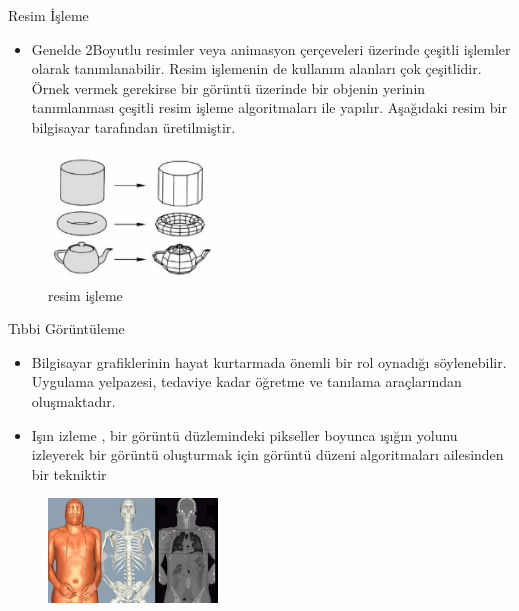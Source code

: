 \documentclass{beamer}
\begin{document}
\begin{frame}{Resim İşleme}
\begin{itemize}
    \item Genelde 2Boyutlu resimler veya animasyon çerçeveleri üzerinde çeşitli işlemler olarak tanımlanabilir. Resim işlemenin de kullanım alanları çok çeşitlidir. Örnek vermek gerekirse bir görüntü üzerinde bir objenin yerinin tanımlanması çeşitli resim işleme algoritmaları ile yapılır. Aşağıdaki resim bir bilgisayar tarafından üretilmiştir.\cite{ebergi}
    
\end{itemize}
\begin{figure}
\includegraphics[width=0.4\textwidth]{resimisleme.jpg}
\caption{resim işleme}
\end{figure}
    
\end{frame}

\begin{frame}{Tıbbi Görüntüleme}
\begin{itemize}

    
    \item Bilgisayar grafiklerinin hayat kurtarmada önemli bir rol oynadığı söylenebilir.
Uygulama yelpazesi, tedaviye kadar öğretme ve tanılama araçlarından
oluşmaktadır.
    \item Işın izleme , bir görüntü düzlemindeki pikseller boyunca ışığın yolunu izleyerek bir görüntü oluşturmak için görüntü düzeni algoritmaları ailesinden bir tekniktir 
    \cite{omercetin}
\end{itemize}

\begin{figure}
\includegraphics[width=0.4\textwidth]{img39.jpg}
\caption{}
\end{figure}
    
\end{frame}
\end{document}
